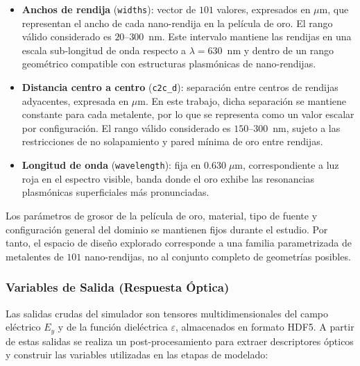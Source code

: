 \begin{itemize}
\item \textbf{Anchos de rendija} (\texttt{widths}): vector de $101$ valores, expresados en $\mu$m, que representan el ancho de cada nano-rendija en la película de oro. El rango válido considerado es $20$--$300$~nm. Este intervalo mantiene las rendijas en una escala sub-longitud de onda respecto a $\lambda = 630$~nm y dentro de un rango geométrico compatible con estructuras plasmónicas de nano-rendijas.

\item \textbf{Distancia centro a centro} (\texttt{c2c\_d}): separación entre centros de rendijas adyacentes, expresada en $\mu$m. En este trabajo, dicha separación se mantiene constante para cada metalente, por lo que se representa como un valor escalar por configuración. El rango válido considerado es $150$--$300$~nm, sujeto a las restricciones de no solapamiento y pared mínima de oro entre rendijas.

\item \textbf{Longitud de onda} (\texttt{wavelength}): fija en $0.630\;\mu$m, correspondiente a luz roja en el espectro visible, banda donde el oro exhibe las resonancias plasmónicas superficiales más pronunciadas.

\end{itemize}

Los parámetros de grosor de la película de oro, material, tipo de fuente y configuración general del dominio se mantienen fijos durante el estudio. Por tanto, el espacio de diseño explorado corresponde a una familia parametrizada de metalentes de $101$ nano-rendijas, no al conjunto completo de geometrías posibles.

\subsubsection{Variables de Salida (Respuesta Óptica)}

Las salidas crudas del simulador son tensores multidimensionales del campo eléctrico $E_y$ y de la función dieléctrica $\varepsilon$, almacenados en formato HDF5. A partir de estas salidas se realiza un post-procesamiento para extraer descriptores ópticos y construir las variables utilizadas en las etapas de modelado:

